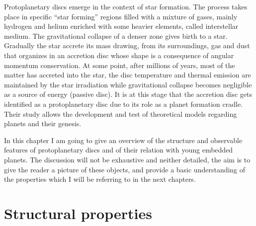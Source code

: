 \documentclass[a4paper,10pt]{report}
\begin{document}
Protoplanetary discs emerge in the context of star formation. 
The process takes place in specific ``star forming'' regions filled with a mixture of gases, mainly hydrogen and helium enriched with some
heavier elements, called interstellar medium. The gravitational collapse of a denser zone gives birth to a star. Gradually the star
accrete its mass drawing, from its surroundings, gas and dust that organizes in an accretion disc whose shape is a consequence of angular momentum conservation.
At some point, after millions of years, most of the matter has accreted into the star,
the disc temperature and thermal emission are maintained by the star irradiation while gravitational collapse becomes negligible as a source of energy (passive disc). 
It is at this stage that the accretion disc gets identified
as a protoplanetary disc due to its role as a planet formation cradle.
Their study allows the development and test of theoretical models regarding planets and their genesis.

In this chapter I am going to give an overview of the structure and observable features
of protoplanetary discs and of their relation with young embedded planets. The discussion will not be
exhaustive and neither detailed, the aim is to give
the reader a picture of these objects, and provide a basic understanding of the 
properties which I will be referring to in the next chapters.

\section{Structural properties}
\end{document}

